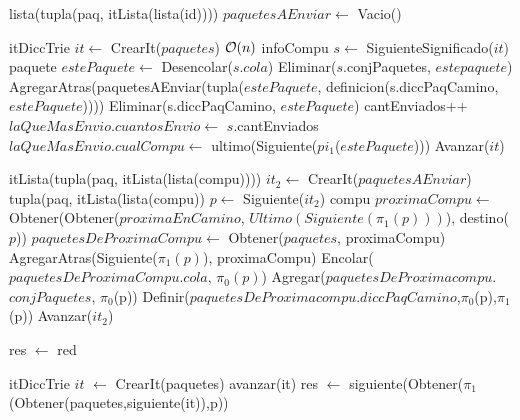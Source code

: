 \begin{Algoritmos}
\begin{algorithm}
\begin{algorithmic}[1]
  \State lista(tupla(paq, itLista(lista(id)))) $paquetesAEnviar \gets$ Vacio()
  
  \State itDiccTrie $it \gets$ CrearIt($paquetes$)
   \Comment $\mathcal{O}(n)$
  	\State infoCompu $s \gets$ SiguienteSignificado($it$) 
  		\State paquete $estePaquete \gets$ Desencolar($s$.$cola$)
  		\State Eliminar($s$.conjPaquetes, $estepaquete$)
		\State AgregarAtras(paquetesAEnviar(tupla($estePaquete$, definicion(s.diccPaqCamino, $estePaquete$))))
		\State Eliminar(s.diccPaqCamino, $estePaquete$) 
		\State cantEnviados++
		   \State $laQueMasEnvio.cuantosEnvio \gets$ $s$.cantEnviados
		   \State $laQueMasEnvio.cualCompu \gets$ ultimo(Siguiente($pi_1$($estePaquete$)))
		\EndIf
	\EndIf
	\State Avanzar($it$)
  \EndWhile 
   
  \State itLista(tupla(paq, itLista(lista(compu)))) $it_2 \gets$ CrearIt($paquetesAEnviar$)
      \State tupla(paq, itLista(lista(compu)) $p \gets$ Siguiente($it_2$)
      \State compu $proximaCompu \gets$ Obtener(Obtener($proximaEnCamino$, $Ultimo(Siguiente(\pi_1(p)))$), destino($p$))
      \State $paquetesDeProximaCompu \gets$ Obtener($paquetes$, proximaCompu)
      \State AgregarAtras(Siguiente($\pi_1(p)$), proximaCompu)
      \State Encolar($paquetesDeProximaCompu$.$cola$, $\pi_0(p)$)
      \State Agregar($paquetesDeProximacompu$.$conjPaquetes$, $\pi_0$(p))
	  \State Definir($paquetesDeProximacompu.diccPaqCamino$,$\pi_0$(p),$\pi_1$(p))      
      \State Avanzar($it_2$)
  \EndWhile
 
 \EndProcedure
\end{algorithmic}


\end{algorithm}

\begin{algorithm}

\begin{algorithmic}[1]
 \State res $\gets$ red
 \EndProcedure
\end{algorithmic}

\begin{algorithmic}[1]
   \State itDiccTrie $it$ $\gets$ CrearIt(paquetes)
   \State avanzar(it)
   \EndWhile
   \State res $\gets$ siguiente(Obtener($\pi_1$(Obtener(paquetes,siguiente(it)),p))
  \EndProcedure
\end{algorithmic}


\end{algorithm}
\end{Algoritmos}
